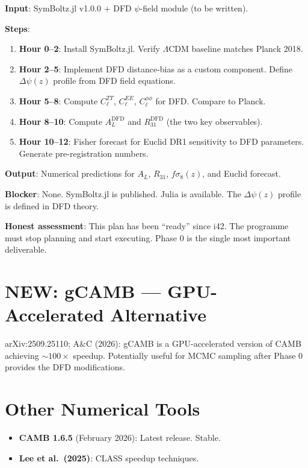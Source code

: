 \documentclass[11pt,a4paper]{article}
\newcommand{\NEW}{\textcolor{dfdblue}{\textbf{NEW}}}
\begin{document}
\begin{tcolorbox}[colback=red!5!white, colframe=red!60!black,
  title={PHASE 0: 12-Hour Execution Plan}]

\textbf{Input}: SymBoltz.jl v1.0.0 + DFD $\psi$-field module (to be written).

\textbf{Steps}:
\begin{enumerate}
\item \textbf{Hour 0--2}: Install SymBoltz.jl. Verify $\Lambda$CDM baseline matches Planck 2018.
\item \textbf{Hour 2--5}: Implement DFD distance-bias as a custom component. Define $\Delta\psi(z)$ profile from DFD field equations.
\item \textbf{Hour 5--8}: Compute $C_\ell^{TT}$, $C_\ell^{EE}$, $C_\ell^{\phi\phi}$ for DFD. Compare to Planck.
\item \textbf{Hour 8--10}: Compute $A_L^{\text{DFD}}$ and $R_{31}^{\text{DFD}}$ (the two key observables).
\item \textbf{Hour 10--12}: Fisher forecast for Euclid DR1 sensitivity to DFD parameters. Generate pre-registration numbers.
\end{enumerate}

\textbf{Output}: Numerical predictions for $A_L$, $R_{31}$, $f\sigma_8(z)$, and Euclid forecast.

\textbf{Blocker}: None. SymBoltz.jl is published. Julia is available. The $\Delta\psi(z)$ profile is defined in DFD theory.

\textbf{Honest assessment}: This plan has been ``ready'' since i42. The programme must stop planning and start executing. Phase 0 is the single most important deliverable.
\end{tcolorbox}

\section{\NEW: gCAMB --- GPU-Accelerated Alternative}

arXiv:2509.25110; A\&C (2026): gCAMB is a GPU-accelerated version of CAMB achieving $\sim 100\times$ speedup. Potentially useful for MCMC sampling after Phase 0 provides the DFD modifications.

\section{Other Numerical Tools}

\begin{itemize}
\item \textbf{CAMB 1.6.5} (February 2026): Latest release. Stable.
\item \textbf{Lee et al.\ (2025)}: CLASS speedup techniques.
\end{itemize}
\end{document}
